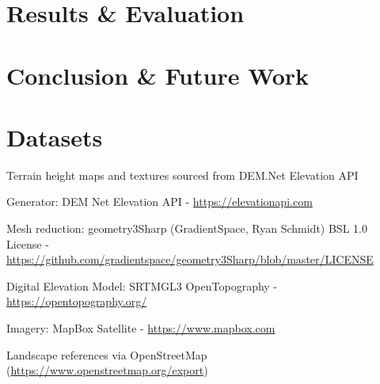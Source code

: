 \documentclass[sigconf,authordraft]{acmart}
\begin{document}
\section{Results \& Evaluation}

\section{Conclusion \& Future Work}

\begin{acks}

\end{acks}

\section*{Datasets}
{\raggedright
Terrain height maps and textures sourced from DEM.Net Elevation API

Generator: DEM Net Elevation API -
\url{https://elevationapi.com}

Mesh reduction: geometry3Sharp (GradientSpace, Ryan Schmidt) BSL 1.0 License -
\url{https://github.com/gradientspace/geometry3Sharp/blob/master/LICENSE}

Digital Elevation Model: SRTM\textunderscore{}GL3 OpenTopography -
\url{https://opentopography.org/}

Imagery: MapBox Satellite -
\url{https://www.mapbox.com}

Landscape references via OpenStreetMap
(\url{https://www.openstreetmap.org/export})
}



\appendix
\end{document}
